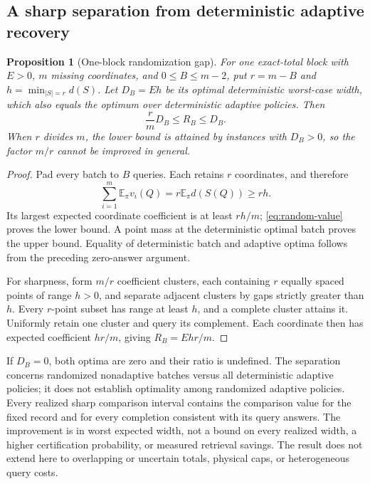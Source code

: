 \documentclass[12pt]{article}
\newtheorem{proposition}{Proposition}
\begin{document}
\subsection{A sharp separation from deterministic adaptive recovery}
\begin{proposition}[One-block randomization gap]
\label{prop:random-gap}
For one exact-total block with $E>0$, $m$ missing coordinates, and
$0\leq B\leq m-2$, put $r=m-B$ and
$h=\min_{|S|=r}d(S)$. Let $D_B=Eh$ be its optimal deterministic
worst-case width, which also equals the optimum over deterministic
adaptive policies. Then
\begin{equation}
 \frac{r}{m}D_B\leq R_B\leq D_B.
 \label{eq:random-gap}
\end{equation}
When $r$ divides $m$, the lower bound is attained by instances with
$D_B>0$, so the factor $m/r$ cannot be improved in general.
\end{proposition}
\begin{proof}
Pad every batch to $B$ queries. Each retains $r$ coordinates, and therefore
\[
 \sum_{i=1}^m\mathbb E_\pi v_i(Q)
 =r\mathbb E_\pi d(S(Q))\geq rh.
\]
Its largest expected coordinate coefficient is at least $rh/m$;
\eqref{eq:random-value} proves the lower bound. A point mass at the
deterministic optimal batch proves the upper bound. Equality of
deterministic batch and adaptive optima follows from the preceding
zero-answer argument.

For sharpness, form $m/r$ coefficient clusters, each containing $r$
equally spaced points of range $h>0$, and separate adjacent clusters
by gaps strictly greater than $h$. Every $r$-point subset has range
at least $h$, and a complete cluster attains it. Uniformly retain one
cluster and query its complement. Each coordinate then has expected
coefficient $hr/m$, giving $R_B=Ehr/m$.
\end{proof}

If $D_B=0$, both optima are zero and their ratio is undefined.
The separation concerns randomized nonadaptive batches versus all
deterministic adaptive policies; it does not establish optimality among
randomized adaptive policies. Every realized sharp comparison interval
contains the comparison value for the fixed record and for every completion
consistent with its query answers. The improvement is in worst expected width, not a bound
on every realized width, a higher certification probability, or measured
retrieval savings. The result does not extend here to overlapping or
uncertain totals, physical caps, or heterogeneous query costs.
\end{document}
